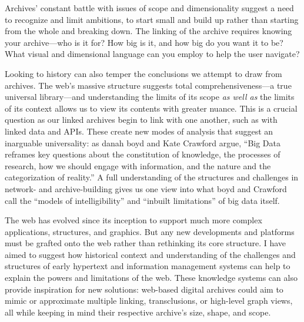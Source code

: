 Archives' constant battle with issues of scope and dimensionality suggest a need to recognize and limit ambitions, to start small and build up rather than starting from the whole and breaking down. The linking of the archive requires knowing your archive---who is it for? How big is it, and how big do you want it to be? What visual and dimensional language can you employ to help the user navigate?

Looking to history can also temper the conclusions we attempt to draw from archives. The web's massive structure suggests total comprehensiveness---a true universal library---and understanding the limits of its scope \emph{as well as} the limits of its context allows us to view its contents with greater nuance. This is a crucial question as our linked archives begin to link with one another, such as with linked data and APIs. These create new modes of analysis that suggest an inarguable universality: as danah boyd and Kate Crawford argue, ``Big Data reframes key questions about the constitution of knowledge, the processes of research, how we should engage with information, and the nature and the categorization of reality.''\autocite{crawford_critical_2012} A full understanding of the structures and challenges in network- and archive-building gives us one view into what boyd and Crawford call the ``models of intelligibility'' and ``inbuilt limitations'' of big data itself.

The web has evolved since its inception to support much more complex applications, structures, and graphics. But any new developments and platforms must be grafted onto the web rather than rethinking its core structure. I have aimed to suggest how historical context and understanding of the challenges and structures of early hypertext and information management systems can help to explain the powers and limitations of the web. These knowledge systems can also provide inspiration for new solutions: web-based digital archives could aim to mimic or approximate multiple linking, transclusions, or high-level graph views, all while keeping in mind their respective archive's size, shape, and scope.
